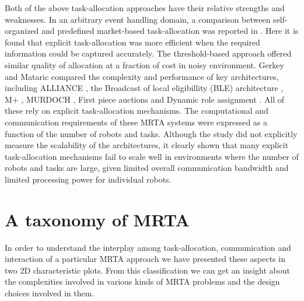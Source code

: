 \documentclass[journal]{IEEEtran}
\begin{document}
Both of the above task-allocation approaches have their relative strengths and weaknesses. In an arbitrary event handling domain, a comparison between self-organized and predefined market-based task-allocation was reported in \cite{kalra+2007}.  Here it is found that explicit task-allocation was more efficient when the required information could be captured accurately.  The threshold-based approach offered similar quality of allocation at a fraction of cost in noisy environment.  
Gerkey and Mataric \cite{Gerkey+2003} compared the complexity and performance of key architectures, including ALLIANCE \cite{Parker1998}, the Broadcast of local eligibillity (BLE) architecture \cite{Werger2001}, M+ \cite{Botelho+1999}, MURDOCH \cite{Gerkey+2002}, First piece auctions \cite{Zlot+2002} and Dynamic role assignment \cite{Chaimowicz2002}.  All of these rely on explicit task-allocation mechanisms. The computational and communication requirements of these MRTA systems were expressed as a function of the number of robots and tasks.  Although the study did not explicitly measure the scalability of the architectures, it clearly shown that many explicit task-allocation mechanisms fail to scale well in environments where the number of robots and tasks are large, given limited overall communication bandwidth and limited processing power for individual robots.
\section{A taxonomy of MRTA}
\label{sec:taxonomy}
In order to understand the interplay among task-allocation, communication and interaction of a particular MRTA approach we have presented these aspects in two 2D characteristic plots.  From this classification we can get an insight about the complexities involved in various kinds of MRTA problems and  the design choices involved in them.
\end{document}
